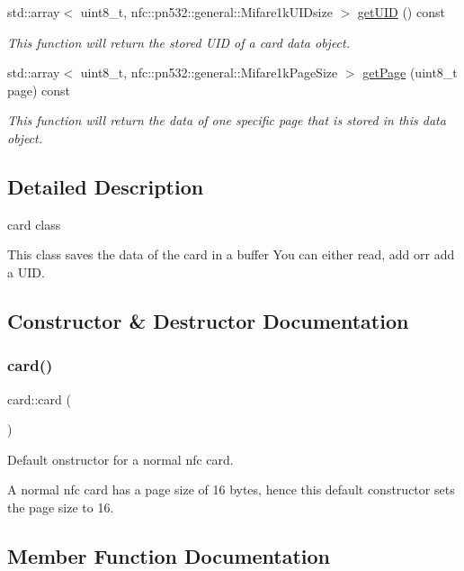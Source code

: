 \begin{DoxyCompactItemize}
std\+::array$<$ uint8\+\_\+t, nfc\+::pn532\+::general\+::\+Mifare1k\+U\+I\+Dsize $>$ \hyperlink{classcard_a2c2641a935f04c070f73a3df9e38b03d}{get\+U\+ID} () const
\begin{DoxyCompactList}\small\item\em This function will return the stored U\+ID of a card data object. \end{DoxyCompactList}\item 
std\+::array$<$ uint8\+\_\+t, nfc\+::pn532\+::general\+::\+Mifare1k\+Page\+Size $>$ \hyperlink{classcard_ad250e1e0d55889e332239b6ab0763223}{get\+Page} (uint8\+\_\+t page) const
\begin{DoxyCompactList}\small\item\em This function will return the data of one specific page that is stored in this data object. \end{DoxyCompactList}\end{DoxyCompactItemize}


\subsection{Detailed Description}
card class 

This class saves the data of the card in a buffer You can either read, add orr add a U\+ID. 

\subsection{Constructor \& Destructor Documentation}
\mbox{\label{classcard_a93a10f1d2e4b3af94962373b88eecd6d}} 
\subsubsection{\texorpdfstring{card()}{card()}}
{\footnotesize\ttfamily card\+::card (\begin{DoxyParamCaption}{ }\end{DoxyParamCaption})\hspace{0.3cm}{\ttfamily [inline]}}



Default onstructor for a normal nfc card. 

A normal nfc card has a page size of 16 bytes, hence this default constructor sets the page size to 16. 

\subsection{Member Function Documentation}
\mbox{\label{classcard_acc59c0616f2cb2a275e4f3dc12cf2e68}} 
